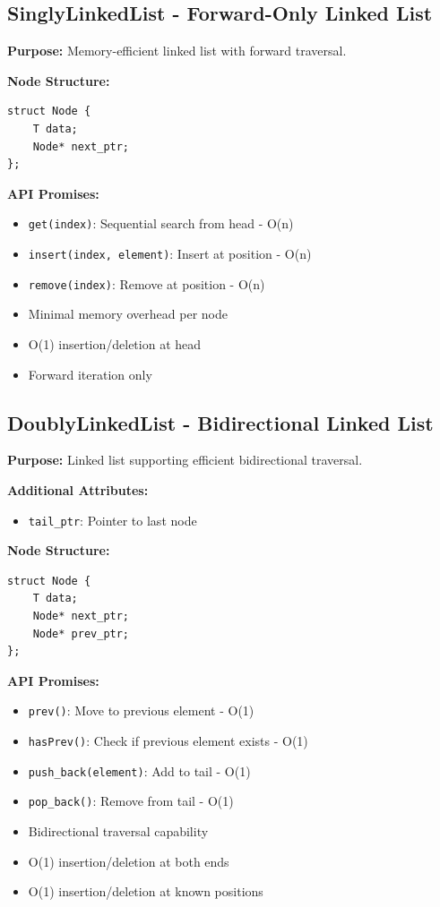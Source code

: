 \documentclass[12pt,a4paper]{article}
\begin{document}
\subsection{SinglyLinkedList - Forward-Only Linked List}

\textbf{Purpose:} Memory-efficient linked list with forward traversal.

\textbf{Node Structure:}
\begin{lstlisting}
struct Node {
    T data;
    Node* next_ptr;
};
\end{lstlisting}

\textbf{API Promises:}
\begin{itemize}
    \item \texttt{get(index)}: Sequential search from head - O(n)
    \item \texttt{insert(index, element)}: Insert at position - O(n)
    \item \texttt{remove(index)}: Remove at position - O(n)
    \item Minimal memory overhead per node
    \item O(1) insertion/deletion at head
    \item Forward iteration only
\end{itemize}

\subsection{DoublyLinkedList - Bidirectional Linked List}

\textbf{Purpose:} Linked list supporting efficient bidirectional traversal.

\textbf{Additional Attributes:}
\begin{itemize}
    \item \texttt{tail\_ptr}: Pointer to last node
\end{itemize}

\textbf{Node Structure:}
\begin{lstlisting}
struct Node {
    T data;
    Node* next_ptr;
    Node* prev_ptr;
};
\end{lstlisting}

\textbf{API Promises:}
\begin{itemize}
    \item \texttt{prev()}: Move to previous element - O(1)
    \item \texttt{hasPrev()}: Check if previous element exists - O(1)
    \item \texttt{push\_back(element)}: Add to tail - O(1)
    \item \texttt{pop\_back()}: Remove from tail - O(1)
    \item Bidirectional traversal capability
    \item O(1) insertion/deletion at both ends
    \item O(1) insertion/deletion at known positions
\end{itemize}
\end{document}
